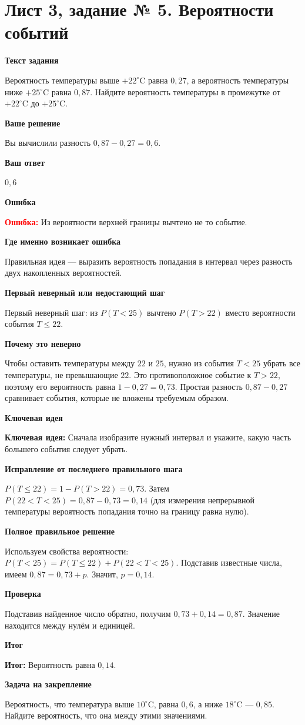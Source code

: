 \documentclass[11pt,a4paper]{article}
\newcommand{\Idea}{\textcolor{blue!60!black}{\textbf{Ключевая идея:}}}
\newcommand{\Res}{\textcolor{teal!60!black}{\textbf{Итог:}}}
\newcommand{\Heading}[2]{\par\medskip\textbf{#1}\par#2\par}
\begin{document}
\section*{Лист 3, задание № 5. Вероятности событий}
\Heading{Текст задания}{Вероятность температуры выше $+22^\circ\text{C}$ равна $0{,}27$, а вероятность температуры ниже $+25^\circ\text{C}$ равна $0{,}87$. Найдите вероятность температуры в промежутке от $+22^\circ\text{C}$ до $+25^\circ\text{C}$.}
\Heading{Ваше решение}{Вы вычислили разность $0{,}87-0{,}27=0{,}6$.}
\Heading{Ваш ответ}{$0{,}6$}
\Heading{Ошибка}{\textcolor{red}{\textbf{Ошибка:}} Из вероятности верхней границы вычтено не то событие.}
\Heading{Где именно возникает ошибка}{Правильная идея --- выразить вероятность попадания в интервал через разность двух накопленных вероятностей.}
\Heading{Первый неверный или недостающий шаг}{Первый неверный шаг: из $P(T<25)$ вычтено $P(T>22)$ вместо вероятности события $T\le22$.}
\Heading{Почему это неверно}{Чтобы оставить температуры между $22$ и $25$, нужно из события $T<25$ убрать все температуры, не превышающие $22$. Это противоположное событие к $T>22$, поэтому его вероятность равна $1-0{,}27=0{,}73$. Простая разность $0{,}87-0{,}27$ сравнивает события, которые не вложены требуемым образом.}
\Heading{Ключевая идея}{\Idea{} Сначала изобразите нужный интервал и укажите, какую часть большего события следует убрать.}
\Heading{Исправление от последнего правильного шага}{$P(T\le22)=1-P(T>22)=0{,}73$. Затем $P(22<T<25)=0{,}87-0{,}73=0{,}14$ (для измерения непрерывной температуры вероятность попадания точно на границу равна нулю).}
\Heading{Полное правильное решение}{Используем свойства вероятности: $P(T<25)=P(T\le22)+P(22<T<25)$. Подставив известные числа, имеем $0{,}87=0{,}73+p$. Значит, $p=0{,}14$.}
\Heading{Проверка}{Подставив найденное число обратно, получим $0{,}73+0{,}14=0{,}87$. Значение находится между нулём и единицей.}
\Heading{Итог}{\Res{} Вероятность равна $0{,}14$.}
\Heading{Задача на закрепление}{Вероятность, что температура выше $10^\circ\text{C}$, равна $0{,}6$, а ниже $18^\circ\text{C}$ --- $0{,}85$. Найдите вероятность, что она между этими значениями.}
\newpage
{}\label{task:3_9}
\end{document}
